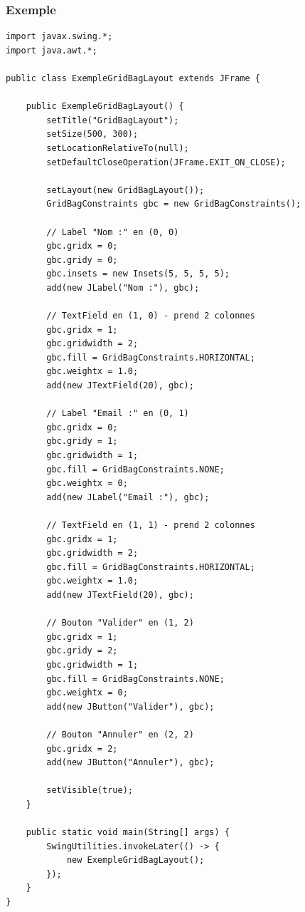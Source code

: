 \documentclass[11pt,a4paper]{article}
\begin{document}
\subsubsection{Exemple}

\begin{lstlisting}
import javax.swing.*;
import java.awt.*;

public class ExempleGridBagLayout extends JFrame {
    
    public ExempleGridBagLayout() {
        setTitle("GridBagLayout");
        setSize(500, 300);
        setLocationRelativeTo(null);
        setDefaultCloseOperation(JFrame.EXIT_ON_CLOSE);
        
        setLayout(new GridBagLayout());
        GridBagConstraints gbc = new GridBagConstraints();
        
        // Label "Nom :" en (0, 0)
        gbc.gridx = 0;
        gbc.gridy = 0;
        gbc.insets = new Insets(5, 5, 5, 5);
        add(new JLabel("Nom :"), gbc);
        
        // TextField en (1, 0) - prend 2 colonnes
        gbc.gridx = 1;
        gbc.gridwidth = 2;
        gbc.fill = GridBagConstraints.HORIZONTAL;
        gbc.weightx = 1.0;
        add(new JTextField(20), gbc);
        
        // Label "Email :" en (0, 1)
        gbc.gridx = 0;
        gbc.gridy = 1;
        gbc.gridwidth = 1;
        gbc.fill = GridBagConstraints.NONE;
        gbc.weightx = 0;
        add(new JLabel("Email :"), gbc);
        
        // TextField en (1, 1) - prend 2 colonnes
        gbc.gridx = 1;
        gbc.gridwidth = 2;
        gbc.fill = GridBagConstraints.HORIZONTAL;
        gbc.weightx = 1.0;
        add(new JTextField(20), gbc);
        
        // Bouton "Valider" en (1, 2)
        gbc.gridx = 1;
        gbc.gridy = 2;
        gbc.gridwidth = 1;
        gbc.fill = GridBagConstraints.NONE;
        gbc.weightx = 0;
        add(new JButton("Valider"), gbc);
        
        // Bouton "Annuler" en (2, 2)
        gbc.gridx = 2;
        add(new JButton("Annuler"), gbc);
        
        setVisible(true);
    }
    
    public static void main(String[] args) {
        SwingUtilities.invokeLater(() -> {
            new ExempleGridBagLayout();
        });
    }
}
\end{lstlisting}
\end{document}

